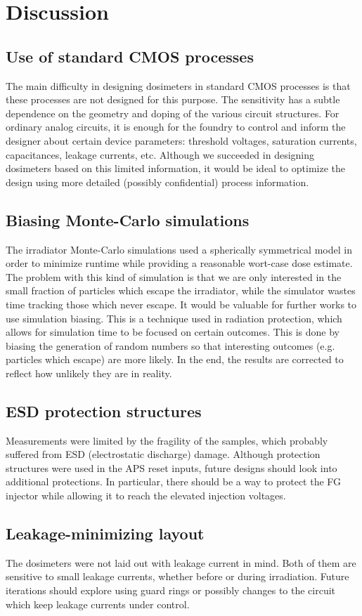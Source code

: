 \section{Discussion}
\subsection{Use of standard CMOS processes}
The main difficulty in designing dosimeters in standard CMOS processes
is that these processes are not designed for this purpose.
The sensitivity has a subtle dependence on the geometry and doping of the
various circuit structures.
For ordinary analog circuits, it is enough for the foundry to control and inform the designer about
certain device parameters: threshold voltages, saturation currents, capacitances, leakage currents, etc.
Although we succeeded in designing dosimeters based on this limited information,
it would be ideal to optimize the design using more detailed 
(possibly confidential) process information.
\subsection{Biasing Monte-Carlo simulations}
The irradiator Monte-Carlo simulations used a spherically symmetrical model
in order to minimize runtime while providing a reasonable wort-case dose estimate.
The problem with this kind of simulation is that we are only interested in 
the small fraction of particles which escape the irradiator,
while the simulator wastes time tracking those which never escape.
It would be valuable for further works to use simulation biasing.
This is a technique used in radiation protection,
which allows for simulation time to be focused on certain outcomes.
This is done by biasing the generation of random numbers so that interesting outcomes
(e.g. particles which escape) are more likely.
In the end, the results are corrected to reflect how unlikely they are in reality.
\subsection{ESD protection structures}
Measurements were limited by the fragility of the samples,
which probably suffered from ESD (electrostatic discharge) damage.
Although protection structures were used in the APS reset inputs,
future designs should look into additional protections.
In particular, there should be a way to protect the FG injector
while allowing it to reach the elevated injection voltages.
\subsection{Leakage-minimizing layout}
The dosimeters were not laid out with leakage current in mind.
Both of them are sensitive to small leakage currents, whether before or during irradiation.
Future iterations should explore using guard rings or possibly changes to the circuit
which keep leakage currents under control.
